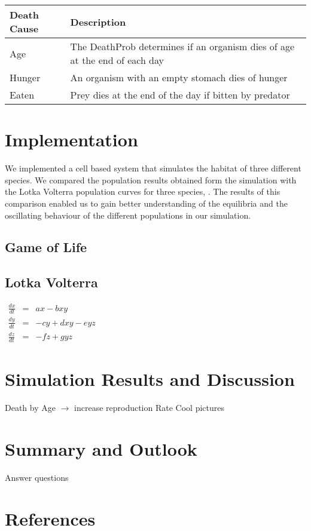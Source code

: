 \documentclass[11pt]{article}
\begin{document}
\begin{tabular}{l|l}\label{tab:deathCauses}
Death Cause & Description \\ 
\hline 
\hline 
Age & The DeathProb determines if an organism dies of age at the end of each day\\ 
\hline 
Hunger & An organism with an empty stomach dies of hunger \\ 
\hline 
Eaten & Prey dies at the end of the day if bitten by predator \\  
\end{tabular} 

\section{Implementation}
We implemented a cell based system that simulates the habitat of three different species.
We compared the population results obtained form the simulation with the Lotka Volterra population curves for three species, \cite{lotkaVolterraThreeSpecies}. The results of this comparison enabled us to gain better understanding of the equilibria and the oscillating behaviour of the different populations in our simulation.
\subsection{Game of Life}

\subsection{Lotka Volterra}

$
\begin{array}{rcl}
\frac{dx}{dt} & = & ax-bxy \\ 
\frac{dy}{dt} & = & -cy+dxy-eyz \\ 
\frac{dz}{dt} & = & -fz+gyz
\end{array}
$
\section{Simulation Results and Discussion}
Death by Age $\rightarrow$ increase reproduction Rate
Cool pictures

\section{Summary and Outlook}
Answer questions

\section{References}




\end{document}
